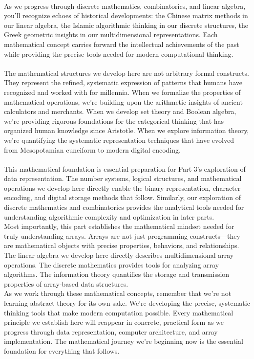 \\
As we progress through discrete mathematics, combinatorics, and linear algebra, you'll recognize echoes of historical developments: the Chinese matrix methods in our linear algebra, the Islamic algorithmic thinking in our discrete structures, the Greek geometric insights in our multidimensional representations. Each mathematical concept carries forward the intellectual achievements of the past while providing the precise tools needed for modern computational thinking.\\
\\
The mathematical structures we develop here are not arbitrary formal constructs. They represent the refined, systematic expression of patterns that humans have recognized and worked with for millennia. When we formalize the properties of mathematical operations, we're building upon the arithmetic insights of ancient calculators and merchants. When we develop set theory and Boolean algebra, we're providing rigorous foundations for the categorical thinking that has organized human knowledge since Aristotle. When we explore information theory, we're quantifying the systematic representation techniques that have evolved from Mesopotamian cuneiform to modern digital encoding.\\
\\
This mathematical foundation is essential preparation for Part 3's exploration of data representation. The number systems, logical structures, and mathematical operations we develop here directly enable the binary representation, character encoding, and digital storage methods that follow. Similarly, our exploration of discrete mathematics and combinatorics provides the analytical tools needed for understanding algorithmic complexity and optimization in later parts.\\
Most importantly, this part establishes the mathematical mindset needed for truly understanding arrays. Arrays are not just programming constructs—they are mathematical objects with precise properties, behaviors, and relationships. The linear algebra we develop here directly describes multidimensional array operations. The discrete mathematics provides tools for analyzing array algorithms. The information theory quantifies the storage and transmission properties of array-based data structures.\\
As we work through these mathematical concepts, remember that we're not learning abstract theory for its own sake. We're developing the precise, systematic thinking tools that make modern computation possible. Every mathematical principle we establish here will reappear in concrete, practical form as we progress through data representation, computer architecture, and array implementation. The mathematical journey we're beginning now is the essential foundation for everything that follows.

